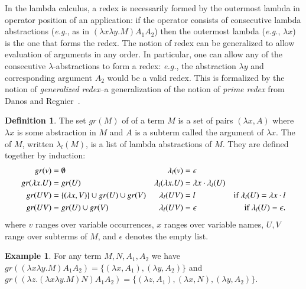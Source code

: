 \documentclass{elsarticle}
\makeatletter
\theoremstyle{plain}
\theoremstyle{definition}
\newtheorem{definition}{Definition}[section]
\newtheorem{example}{Example}[section]
\renewcommand\eg{{\it e.g.\@\xspace}}
\makeatother
\begin{document}
In the lambda calculus, a redex is necessarily formed by the outermost lambda in operator position of an application: if the operator consists of consecutive lambda abstractions (\eg, as in $(\lambda x \lambda y . M) A_1 A_2$) then the outermost lambda (\eg, $\lambda x$) is the one that forms the redex. The notion of redex can be generalized to allow evaluation of arguments in any order. In particular, one can allow any of the consecutive $\lambda$-abstractions to form a redex: \eg, the abstraction $\lambda y$ and corresponding argument $A_2$ would be a valid redex. This is formalized by the notion of \emph{generalized redex}--a generalization of the notion of \emph{prime redex} from Danos and Regnier~\cite{danos-head,REGNIER1994281}.
\begin{definition}
\label{dfn:generalized_redex}
The set $gr(M)$ of  of a term $M$ is
a set of pairs $(\lambda x, A)$ where $\lambda x$ is some abstraction in $M$ and $A$ is a subterm called the argument of $\lambda x$.
The  of $M$, written $\lambda_l(M)$, is a list of lambda abstractions of $M$. They are defined together by induction:
\begin{align*}
gr(v) &= \emptyset & \lambda_l(v) &= \epsilon\\
gr(\lambda x. U) &= gr(U) & \lambda_l(\lambda x. U) &= \lambda x \cdot \lambda_l(U) \\
gr(U V) &= \{ (\lambda x, V) \} \cup gr(U) \cup gr(V) &
\lambda_l(U V) &= l & \mbox{if $\lambda_l(U) = \lambda x \cdot l$} \\
gr(U V) &= gr(U) \cup gr(V) & \lambda_l(U V) &= \epsilon & \mbox{if $\lambda_l(U) = \epsilon$.}
\end{align*}
where $v$ ranges over variable occurrences, $x$ ranges over variable names, $U, V$ range over subterms of $M$, and $\epsilon$ denotes the empty list.
\end{definition}

\begin{example} For any term $M, N, A_1, A_2$ we have
$gr((\lambda x \lambda y . M) A_1 A_2) = \{ (\lambda x, A_1), (\lambda y, A_2)\}$ and
 $gr((\lambda z . (\lambda x \lambda y . M) N) A_1 A_2) = \{ (\lambda z, A_1), (\lambda x, N), (\lambda y, A_2)\}$.
\end{example}
\end{document}
